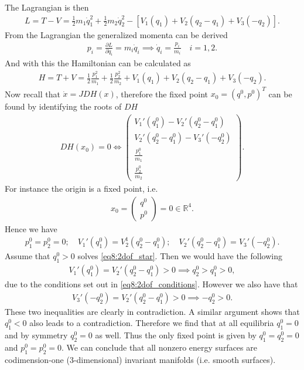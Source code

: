 \begin{ex}
	The Lagrangian is then
	\begin{align}
		L=T-V = \frac{1}{2} m_1 \dot{q}_{1}^{2} + \frac{1}{2}m_2 \dot{q}_{2}^{2} - \left[V_1(q_1) + V_2(q_2 - q_1) + V_3(-q_2) \right].
	\end{align}
From the Lagrangian the generalized momenta can be derived
\begin{align}
	p_i = \frac{\partial L}{\partial \dot{q}_{i}} = m_{i} \dot{q}_{i} \implies \dot{q}_{i} = \frac{p_i}{m_i}\quad i=1,2.
\end{align}
And with this the Hamiltonian can be calculated as
\begin{align}
	H = T+V = \frac{1}{2}\frac{p_1^{2}}{m_1} + \frac{1}{2}\frac{p_{2}^{2}}{m_{2}} + V_1(q_1) + V_2(q_2 - q_1) +V_{3}(-q_2).
\end{align}
Now recall that $\dot{x}=JDH(x)$, therefore the fixed point $x_0=(q^{0}, p^{0})^{T}$ can be found by identifying the roots of $DH$ 
\begin{align}
	DH(x_0)=0 \Leftrightarrow
	\begin{pmatrix}
		V_{1}'(q_{1}^{0}) - V_{2}'(q_{2}^{0} - q_{1}^{0}) \\
		V_{2}'(q_{2}^{0} - q_{1}^{0}) - V_{3}'(-q_{2}^{0}) \\
		\frac{p_{1}^0}{m_1} \\
		\frac{p_{2}^{0}}{m_2}
	\end{pmatrix}.
\end{align}
For instance the origin is a fixed point, i.e.
\begin{align}
	x_0 = 
	\begin{pmatrix}
		q^{0} \\ p^{0}
	\end{pmatrix}
	=0\in \mathbb{R}^{4}.
\end{align}
Hence we have
\begin{align}
	p_{1}^{0} = p_{2}^{0}= 0;\quad V_{1}'(q_{1}^{0}) = V_{2}^{1}(q_2^{0}-q_{1}^{0});\quad V_{2}'(q_{2}^{0}-q_{1}^{0})=V_{3}'(-q_{2}^{0}) \label{eq8:2dof_star}.
\end{align}
Assume that $q_{1}^{0}>0$ solves \eqref{eq8:2dof_star}. Then we would have the following
\begin{align}
	V_{1}'(q_{1}^{0}) = V_{2}'(q_{2}^{0} - q_{1}^{0}) > 0 \implies q_{2}^{0}>q_{1}^{0} >0,
\end{align}
due to the conditions set out in \eqref{eq8:2dof_conditions}. However we also have that
\begin{align}
	V_{3}'(-q_{2}^{0}) = V_{2}'(q_{2}^{0}-q_{1}^{0})>0 \implies -q_{2}^{0}>0.
\end{align}
These two inequalities are clearly in contradiction. A similar argument shows that $q_{1}^{0} < 0$ also leads to a contradiction. Therefore we find that at all equilibria $q_{1}^{0}=0$ and by symmetry $q_{2}^{0}=0$ as well. Thus the only fixed point is given by $q_{1}^{0}=q_{2}^{0}=0$ and $p_{1}^{0}=p_{2}^{0}=0$. We can conclude that all nonzero energy surfaces are codimension-one (3-dimensional) invariant manifolds (i.e. smooth surfaces).


\end{ex}
